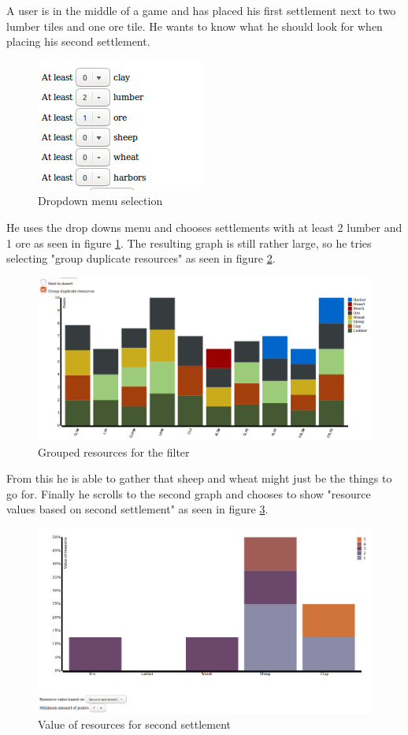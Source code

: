 \documentclass[journal]{vgtc}                %
\begin{document}
A user is in the middle of a game and has placed his first settlement next to
two lumber tiles and one ore tile. He wants to know what he should look for
when placing his second settlement.
\begin{figure}[!h]
  \centering
  \includegraphics[scale=0.6]{scen1-1.png}
  \caption{Dropdown menu selection}
  \label{fig:s11}
\end{figure}
\noindent
He uses the drop downs menu and chooses settlements with at least 2 lumber
and 1 ore as seen in figure \ref{fig:s11}. The resulting graph is still rather
large, so he tries selecting "group duplicate resources" as seen in figure
\ref{fig:s12}.
\begin{figure}[!h]
  \centering
  \includegraphics[width=\linewidth]{scen1-2.png}
  \caption{Grouped resources for the filter}
  \label{fig:s12}
\end{figure}
\noindent
From this he is able to gather that sheep and wheat
might just be the things to go for. Finally he scrolls to the second graph and
chooses to show "resource values based on second settlement" as seen in figure
\ref{fig:s13}.
\begin{figure}[!h]
  \centering
  \includegraphics[width=\linewidth]{scen1-3.png}
  \caption{Value of resources for second settlement}
  \label{fig:s13}
\end{figure}
\end{document}
